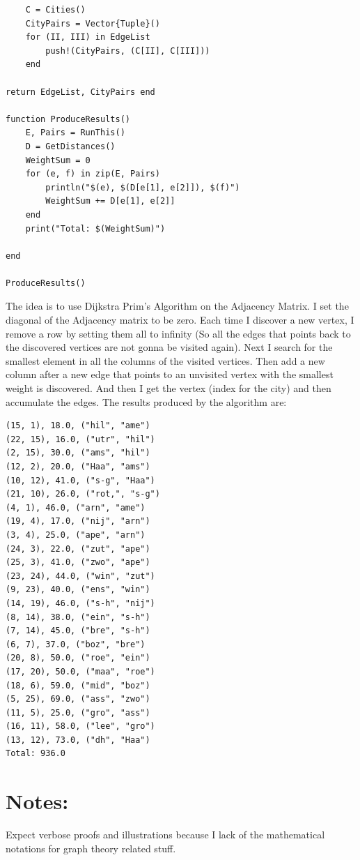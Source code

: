 \documentclass[]{article}
\theoremstyle{definition}
\begin{document}
\begin{lstlisting}
    C = Cities()   
    CityPairs = Vector{Tuple}()
    for (II, III) in EdgeList
        push!(CityPairs, (C[II], C[III]))
    end

return EdgeList, CityPairs end

function ProduceResults()
    E, Pairs = RunThis()
    D = GetDistances()
    WeightSum = 0
    for (e, f) in zip(E, Pairs)
        println("$(e), $(D[e[1], e[2]]), $(f)")
        WeightSum += D[e[1], e[2]]
    end
    print("Total: $(WeightSum)")

end

ProduceResults()
    \end{lstlisting}
    The idea is to use Dijkstra Prim's Algorithm on the Adjacency Matrix. I set the diagonal of the Adjacency matrix to be zero. Each time I discover a new vertex, I remove a row by setting them all to infinity (So all the edges that points back to the discovered vertices are not gonna be visited again). Next I search for the smallest element in all the columns of the visited vertices.  Then add a new column after a new edge that points to an unvisited vertex with the smallest weight is discovered. And then I get the vertex (index for the city) and then accumulate the edges. The results produced by the algorithm are: 
\begin{tiny}
    \begin{verbatim}
(15, 1), 18.0, ("hil", "ame")
(22, 15), 16.0, ("utr", "hil")
(2, 15), 30.0, ("ams", "hil")
(12, 2), 20.0, ("Haa", "ams")
(10, 12), 41.0, ("s-g", "Haa")
(21, 10), 26.0, ("rot,", "s-g")
(4, 1), 46.0, ("arn", "ame")
(19, 4), 17.0, ("nij", "arn")
(3, 4), 25.0, ("ape", "arn")
(24, 3), 22.0, ("zut", "ape")
(25, 3), 41.0, ("zwo", "ape")
(23, 24), 44.0, ("win", "zut")
(9, 23), 40.0, ("ens", "win")
(14, 19), 46.0, ("s-h", "nij")
(8, 14), 38.0, ("ein", "s-h")
(7, 14), 45.0, ("bre", "s-h")
(6, 7), 37.0, ("boz", "bre")
(20, 8), 50.0, ("roe", "ein")
(17, 20), 50.0, ("maa", "roe")
(18, 6), 59.0, ("mid", "boz")
(5, 25), 69.0, ("ass", "zwo")
(11, 5), 25.0, ("gro", "ass")
(16, 11), 58.0, ("lee", "gro")
(13, 12), 73.0, ("dh", "Haa")
Total: 936.0
    \end{verbatim}
\end{tiny}

\section{Notes: }
    Expect verbose proofs and illustrations because I lack of the mathematical notations for graph theory related stuff. 
\end{document}
